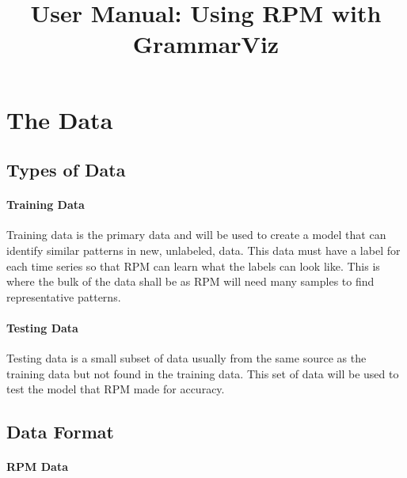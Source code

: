 \documentclass[letterpaper, 12pt]{article}
\begin{document}
\title{User Manual: Using RPM with GrammarViz}
\maketitle
\tableofcontents
\newpage

\section{The Data}

\subsection{Types of Data}

\paragraph{Training Data}
Training data is the primary data and will be used to create a model that can identify similar patterns in new, unlabeled, data. This data must have a label for each time series so that RPM can learn what the labels can look like. This is where the bulk of the data shall be as RPM will need many samples to find representative patterns.

\paragraph{Testing Data}
Testing data is a small subset of data usually from the same source as the training data but not found in the training data. This set of data will be used to test the model that RPM made for accuracy.

\subsection{Data Format}

\paragraph{RPM Data}
\end{document}
